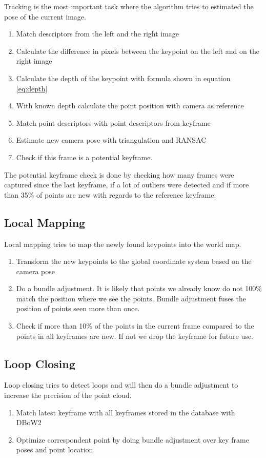 \documentclass[11pt,a4paper,titlepage,oneside]{report}
\begin{document}
Tracking is the most important task where the algorithm tries to estimated the pose of the current image.
\begin{enumerate}
	\item Match descriptors from the left and the right image
	\item Calculate the difference in pixels between the keypoint on the left and on the right image
	\item Calculate the depth of the keypoint with formula shown in equation \ref{eq:depth}
	\item With known depth calculate the point position with camera as reference
	\item Match point descriptors with point descriptors from keyframe
	\item Estimate new camera pose with triangulation and RANSAC
	\item Check if this frame is a potential keyframe.
\end{enumerate}
The potential keyframe check is done by checking how many frames were captured since the last keyframe, if a lot of outliers were detected and if more than 35\% of points are new with regards to the reference keyframe.\\

\subsection{Local Mapping}
Local mapping tries to map the newly found keypoints into the world map.
\begin{enumerate}
	\item Transform the new keypoints to the global coordinate system based on the camera pose
	\item Do a bundle adjustment. It is likely that points we already know do not 100\% match the position where we see the points. Bundle adjustment fuses the position of points seen more than once.
	\item Check if more than 10\% of the points in the current frame compared to the points in all keyframes are new. If not we drop the keyframe for future use.
\end{enumerate}

\subsection{Loop Closing}
Loop closing tries to detect loops and will then do a bundle adjustment to increase the precision of the point cloud.
\begin{enumerate}
	\item Match latest keyframe with all keyframes stored in the database with DBoW2 \cite{dbow}
	\item Optimize correspondent point by doing bundle adjustment over key frame poses and point location
\end{enumerate}
\end{document}
